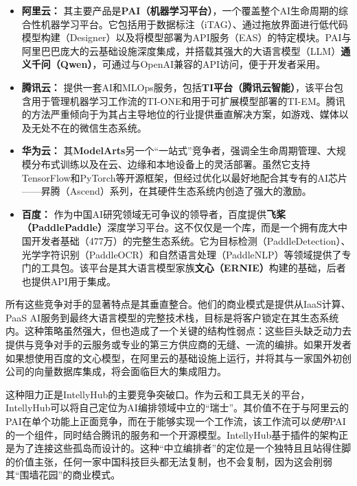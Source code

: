 \documentclass[11点, A4纸, 单面]{article}
\begin{document}
\begin{itemize}
    \item \textbf{阿里云：} 其主要产品是\textbf{PAI（机器学习平台）}，一个覆盖整个AI生命周期的综合性机器学习平台。它包括用于数据标注（iTAG）、通过拖放界面进行低代码模型构建（Designer）以及将模型部署为API服务（EAS）的特定模块\cite{AlibabaPAI}。PAI与阿里巴巴庞大的云基础设施深度集成\cite{AlibabaCloudInfra, AlibabaCloudInfra2}，并搭载其强大的大语言模型（LLM）\textbf{通义千问（Qwen）}，可通过与OpenAI兼容的API访问，便于开发者采用\cite{AlibabaQwen, QwenOpenAIAPI}。
    \item \textbf{腾讯云：} 提供一套AI和MLOps服务，包括\textbf{TI平台（腾讯云智能）}，该平台包含用于管理机器学习工作流的TI-ONE和用于可扩展模型部署的TI-EM\cite{TencentTI}。腾讯的方法严重倾向于为其占主导地位的行业提供垂直解决方案，如游戏、媒体以及无处不在的微信生态系统\cite{TencentEcosystem, TencentEcosystem2}。
    \item \textbf{华为云：} 其\textbf{ModelArts}另一个“一站式”竞争者，强调全生命周期管理、大规模分布式训练以及在云、边缘和本地设备上的灵活部署\cite{HuaweiModelArts, HuaweiModelArts2}。虽然它支持TensorFlow和PyTorch等开源框架，但经过优化以最好地配合其专有的AI芯片——昇腾（Ascend）系列，在其硬件生态系统内创造了强大的激励\cite{HuaweiModelArts3, HuaweiModelArts4}。
    \item \textbf{百度：} 作为中国AI研究领域无可争议的领导者，百度提供\textbf{飞桨（PaddlePaddle）}深度学习平台。这不仅仅是一个库，而是一个拥有庞大中国开发者基础（477万）的完整生态系统\cite{PaddlePaddleDevs}。它为目标检测（PaddleDetection）、光学字符识别（PaddleOCR）和自然语言处理（PaddleNLP）等领域提供了专门的工具包\cite{PaddlePaddleToolkits, PaddlePaddleEcosystem}。该平台是其大语言模型家族\textbf{文心（ERNIE）}构建的基础，后者也提供API用于集成\cite{BaiduERNIE, BaiduERNIE2}。
\end{itemize}

所有这些竞争对手的显著特点是其垂直整合。他们的商业模式是提供从IaaS计算、PaaS AI服务到最终大语言模型的完整技术栈，目标是将客户锁定在其生态系统内。这种策略虽然强大，但也造成了一个关键的结构性弱点：这些巨头缺乏动力去提供与竞争对手的云服务或专业的第三方供应商的无缝、一流的编排。如果开发者如果想使用百度的文心模型，在阿里云的基础设施上运行，并将其与一家国外初创公司的向量数据库集成，将会面临巨大的集成阻力。

这种阻力正是IntellyHub的主要竞争突破口。作为云和工具无关的平台，IntellyHub可以将自己定位为AI编排领域中立的“瑞士”。其价值不在于与阿里云的PAI在单个功能上正面竞争，而在于能够实现一个工作流，该工作流可以\textit{使用}PAI的一个组件，同时结合腾讯的服务和一个开源模型。IntellyHub基于插件的架构正是为了连接这些孤岛而设计的\cite{IntellyHubBP}。这种“中立编排者”的定位是一个独特且且站得住脚的价值主张，任何一家中国科技巨头都无法复制，也不会复制，因为这会削弱其“围墙花园”的商业模式。
\end{document}
